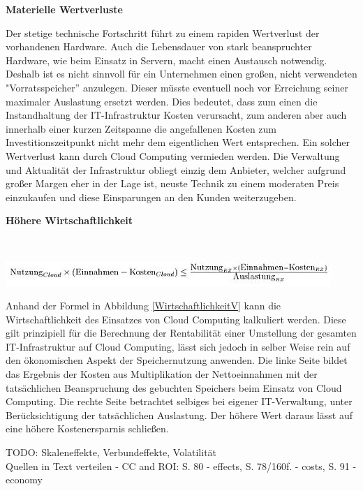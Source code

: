 \documentclass[13pt,a4paper,bibliography=totocnumbered,listof=totocnumbered]{scrartcl}
\begin{document}
\textbf{Materielle Wertverluste}

Der stetige technische Fortschritt führt zu einem rapiden Wertverlust der vorhandenen Hardware. Auch die Lebensdauer von stark beanspruchter Hardware, wie beim Einsatz in Servern, macht einen Austausch notwendig. Deshalb ist es nicht sinnvoll für ein Unternehmen einen großen, nicht verwendeten "Vorratsspeicher'' anzulegen. Dieser müsste eventuell noch vor Erreichung seiner maximaler Auslastung ersetzt werden. Dies bedeutet, dass zum einen die Instandhaltung der IT-Infrastruktur Kosten verursacht, zum anderen aber auch innerhalb einer kurzen Zeitspanne die angefallenen Kosten zum Investitionszeitpunkt nicht mehr dem eigentlichen Wert entsprechen. Ein solcher Wertverlust kann durch Cloud Computing vermieden werden. Die Verwaltung und Aktualität der Infrastruktur obliegt einzig dem Anbieter, welcher aufgrund großer Margen eher in der Lage ist, neuste Technik zu einem moderaten Preis einzukaufen und diese Einsparungen an den Kunden weiterzugeben.

\textbf{Höhere Wirtschaftlichkeit}

\vspace{1em}
$\;$\\
\begin{minipage}{\linewidth}
	\centering
	\includegraphics[width=1.0\linewidth]{./img/Wirtschaftlichkeit.jpg}
 	\label{WirtschaftlichkeitV}
\end{minipage}
\vspace{1em}

Anhand der Formel in Abbildung \ref{WirtschaftlichkeitV} kann die Wirtschaftlichkeit des Einsatzes von Cloud Computing kalkuliert werden. Diese gilt prinzipiell für die Berechnung der Rentabilität einer Umstellung der gesamten IT-Infrastruktur auf Cloud Computing, lässt sich jedoch in selber Weise rein auf den ökonomischen Aspekt der Speichernutzung anwenden. Die linke Seite bildet das Ergebnis der Kosten aus Multiplikation der Nettoeinnahmen mit der tatsächlichen Beanspruchung des gebuchten Speichers beim Einsatz von Cloud Computing. Die rechte Seite betrachtet selbiges bei eigener IT-Verwaltung, unter Berücksichtigung der tatsächlichen Auslastung. Der höhere Wert daraus lässt auf eine höhere Kostenersparnis schließen.

TODO: Skaleneffekte, Verbundeffekte, Volatilität\\
Quellen in Text verteilen - CC and ROI: S. 80 - effects, S. 78/160f. -  costs, S. 91 - economy
\end{document}
